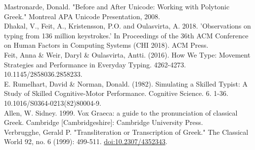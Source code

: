 \documentclass[11pt]{article}
\begin{document}
Mastronarde, Donald. "Before and After Unicode: Working with Polytonic Greek." Montreal APA Unicode Presentation, 2008. \\

Dhakal, V., Feit, A., Kristensson, P.O. and Oulasvirta, A. 2018. 'Observations on typing from 136 million keystrokes.' In Proceedings of the 36th ACM Conference on Human Factors in Computing Systems (CHI 2018). ACM Press. \\

Feit, Anna \& Weir, Daryl \& Oulasvirta, Antti. (2016). How We Type: Movement Strategies and Performance in Everyday Typing. 4262-4273. 10.1145/2858036.2858233. \\

E. Rumelhart, David \& Norman, Donald. (1982). Simulating a Skilled Typist: A Study of Skilled Cognitive-Motor Performance. Cognitive Science. 6. 1-36. 10.1016/S0364-0213(82)80004-9. \\

Allen, W. Sidney. 1999. Vox Graeca: a guide to the pronunciation of classical Greek. Cambridge [Cambridgeshire]: Cambridge University Press. \\

Verbrugghe, Gerald P. "Transliteration or Transcription of Greek." The Classical World 92, no. 6 (1999): 499-511. \url{doi:10.2307/4352343}.
\end{document}
